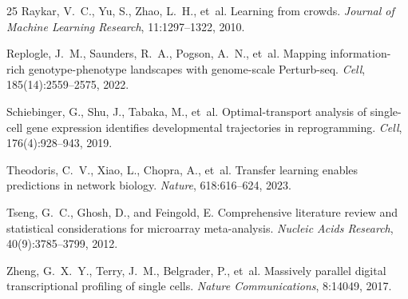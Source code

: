\documentclass[11pt,a4paper]{article}
\begin{document}
\begin{thebibliography}{25}
Raykar, V.~C., Yu, S., Zhao, L.~H., et~al.
\newblock Learning from crowds.
\newblock \emph{Journal of Machine Learning Research}, 11:1297--1322, 2010.

Replogle, J.~M., Saunders, R.~A., Pogson, A.~N., et~al.
\newblock Mapping information-rich genotype-phenotype landscapes with genome-scale {Perturb-seq}.
\newblock \emph{Cell}, 185(14):2559--2575, 2022.

Schiebinger, G., Shu, J., Tabaka, M., et~al.
\newblock Optimal-transport analysis of single-cell gene expression identifies developmental trajectories in reprogramming.
\newblock \emph{Cell}, 176(4):928--943, 2019.

Theodoris, C.~V., Xiao, L., Chopra, A., et~al.
\newblock Transfer learning enables predictions in network biology.
\newblock \emph{Nature}, 618:616--624, 2023.

Tseng, G.~C., Ghosh, D., and Feingold, E.
\newblock Comprehensive literature review and statistical considerations for microarray meta-analysis.
\newblock \emph{Nucleic Acids Research}, 40(9):3785--3799, 2012.

Zheng, G.~X.~Y., Terry, J.~M., Belgrader, P., et~al.
\newblock Massively parallel digital transcriptional profiling of single cells.
\newblock \emph{Nature Communications}, 8:14049, 2017.

\end{thebibliography}
\end{document}
